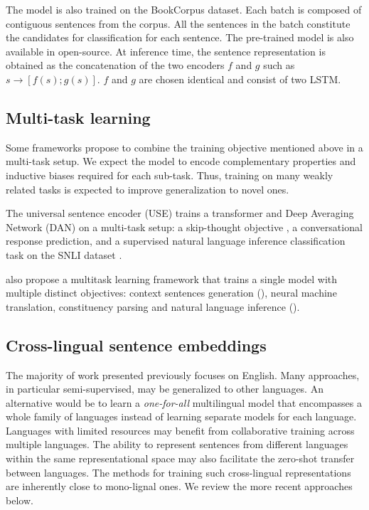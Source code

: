 
The model is also trained on the BookCorpus dataset. Each batch is composed of contiguous sentences from the corpus. All the sentences in the batch constitute the candidates for classification for each sentence. The pre-trained model is also available in open-source. At inference time, the sentence representation is obtained as the concatenation of the two encoders $f$ and $g$ such as $s \rightarrow [f(s);g(s)]$. $f$ and $g$ are chosen identical and consist of two LSTM. 


\subsection{Multi-task learning}

Some frameworks propose to combine the training objective mentioned above in a multi-task setup. We expect the model to encode complementary properties and inductive biases required for each sub-task. Thus, training on many weakly related tasks is expected to improve generalization to novel ones.

The universal sentence encoder (USE) \parencite{cer_18} trains a transformer and Deep Averaging Network (DAN) on a multi-task setup: a skip-thought objective \parencite{kiros_15}, a conversational response prediction, and a supervised natural language inference classification task on the SNLI dataset \parencite{bowman_15, conneau_17}.

\textcite{subramanian_18} also propose a multitask learning framework that trains a single model with multiple distinct objectives: context sentences generation (), neural machine translation, constituency parsing and natural language inference ().

\subsection{Cross-lingual sentence embeddings}

The majority of work presented previously focuses on English. Many approaches, in particular semi-supervised, may be generalized to other languages. An alternative would be to learn a \textit{one-for-all} multilingual model that encompasses a whole family of languages instead of learning separate models for each language. Languages with limited resources may benefit from collaborative training across multiple languages. The ability to represent sentences from different languages within the same representational space may also facilitate the zero-shot transfer between languages. The methods for training such cross-lingual representations are inherently close to mono-lignal ones. We review the more recent approaches below.

